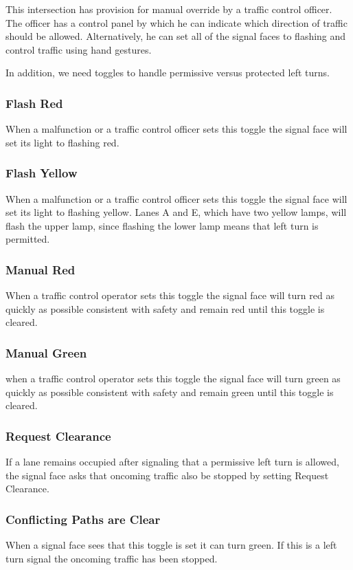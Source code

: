 \documentclass[letterpaper,twoside]{article}
\begin{document}
This intersection has provision for manual override by a traffic control
officer.  The officer has a control panel by which he can indicate which
direction of traffic should be allowed.  Alternatively, he can set all
of the signal faces to flashing and control traffic using hand gestures.

In addition, we need toggles to handle permissive versus protected
left turns.

\subsubsection{Flash Red}
When a malfunction or a traffic control officer sets this toggle
the signal face will set its light to flashing red.

\subsubsection{Flash Yellow}
When a malfunction or a traffic control officer sets this toggle
the signal face will set its light to flashing yellow.
Lanes A and E, which have two yellow lamps, will flash the upper lamp,
since flashing the lower lamp means that left turn is permitted.

\subsubsection{Manual Red}
When a traffic control operator sets this toggle the signal face will
turn red as quickly as possible consistent with safety and remain
red until this toggle is cleared.

\subsubsection{Manual Green}
when a traffic control operator sets this toggle the signal face will
turn green as quickly as possible consistent with safety and remain
green until this toggle is cleared.

\subsubsection{Request Clearance}
If a lane remains occupied after signaling that a permissive left
turn is allowed, the signal face asks that oncoming traffic also
be stopped by setting Request Clearance.

\subsubsection{Conflicting Paths are Clear}
When a signal face sees that this toggle is set it can turn green.
If this is a left turn signal the oncoming traffic has been stopped.
\end{document}
